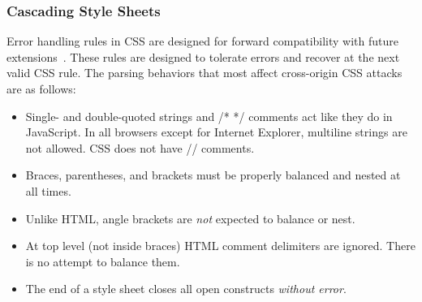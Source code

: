 \documentclass{acm_proc_article-sp}
\begin{document}
\subsubsection{Cascading Style Sheets}
Error handling rules in CSS are designed for forward compatibility
with future extensions~\cite{syndata}. These rules are designed to tolerate errors and recover at the next valid CSS rule. The parsing behaviors that most affect cross-origin CSS attacks are as follows:

\begin{itemize}
\item Single- and double-quoted strings and /* */ comments act like they
do in JavaScript. In all browsers except for Internet Explorer, multiline strings are not allowed. CSS does not have // comments.
\item Braces, parentheses, and brackets must be properly balanced and nested at all times. 
\item Unlike HTML, angle brackets are {\em not} expected to balance or nest. 
\item At top level (not inside braces) HTML comment delimiters are ignored.
There is no attempt to balance them.
\item The end of a style sheet closes all open constructs {\em without error}.  \end{itemize}

\end{document}
